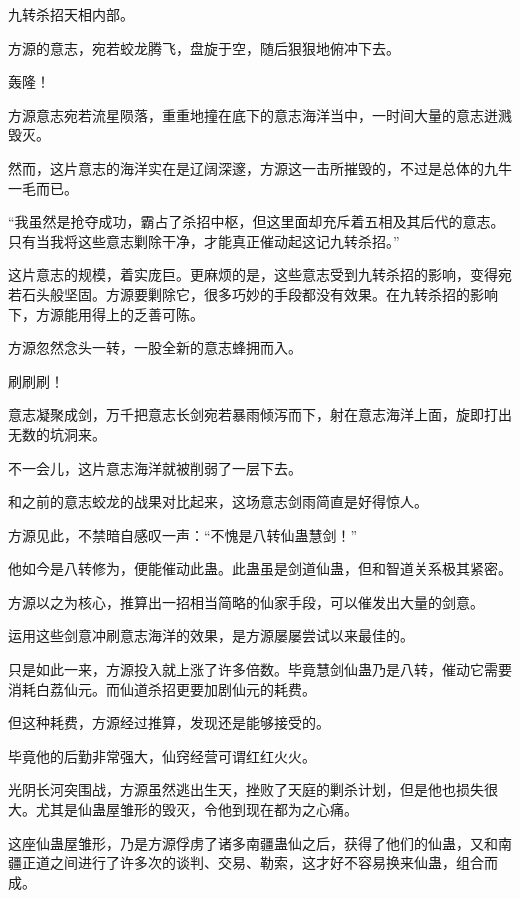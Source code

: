 
\begin{this_body}

九转杀招天相内部。

方源的意志，宛若蛟龙腾飞，盘旋于空，随后狠狠地俯冲下去。

轰隆！

方源意志宛若流星陨落，重重地撞在底下的意志海洋当中，一时间大量的意志迸溅毁灭。

然而，这片意志的海洋实在是辽阔深邃，方源这一击所摧毁的，不过是总体的九牛一毛而已。

“我虽然是抢夺成功，霸占了杀招中枢，但这里面却充斥着五相及其后代的意志。只有当我将这些意志剿除干净，才能真正催动起这记九转杀招。”

这片意志的规模，着实庞巨。更麻烦的是，这些意志受到九转杀招的影响，变得宛若石头般坚固。方源要剿除它，很多巧妙的手段都没有效果。在九转杀招的影响下，方源能用得上的乏善可陈。

方源忽然念头一转，一股全新的意志蜂拥而入。

刷刷刷！

意志凝聚成剑，万千把意志长剑宛若暴雨倾泻而下，射在意志海洋上面，旋即打出无数的坑洞来。

不一会儿，这片意志海洋就被削弱了一层下去。

和之前的意志蛟龙的战果对比起来，这场意志剑雨简直是好得惊人。

方源见此，不禁暗自感叹一声：“不愧是八转仙蛊慧剑！”

他如今是八转修为，便能催动此蛊。此蛊虽是剑道仙蛊，但和智道关系极其紧密。

方源以之为核心，推算出一招相当简略的仙家手段，可以催发出大量的剑意。

运用这些剑意冲刷意志海洋的效果，是方源屡屡尝试以来最佳的。

只是如此一来，方源投入就上涨了许多倍数。毕竟慧剑仙蛊乃是八转，催动它需要消耗白荔仙元。而仙道杀招更要加剧仙元的耗费。

但这种耗费，方源经过推算，发现还是能够接受的。

毕竟他的后勤非常强大，仙窍经营可谓红红火火。

光阴长河突围战，方源虽然逃出生天，挫败了天庭的剿杀计划，但是他也损失很大。尤其是仙蛊屋雏形的毁灭，令他到现在都为之心痛。

这座仙蛊屋雏形，乃是方源俘虏了诸多南疆蛊仙之后，获得了他们的仙蛊，又和南疆正道之间进行了许多次的谈判、交易、勒索，这才好不容易换来仙蛊，组合而成。


\end{this_body}
